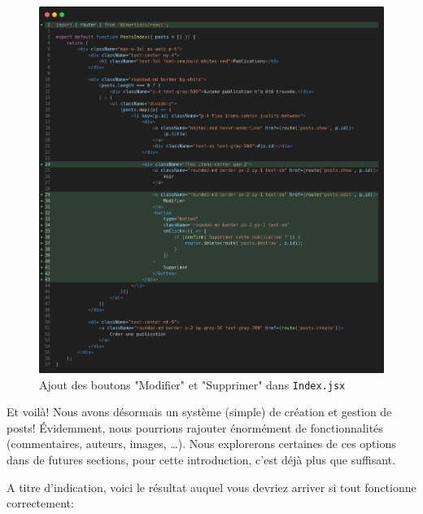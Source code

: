 \begin{figure}
    \centering
    \includegraphics[width=\textwidth]{figures-C1/posts_index_add_edit_delete.png}
    \caption{Ajout des boutons "Modifier" et "Supprimer" dans \texttt{Index.jsx}
    \label{fig:post_delete_blade}}
\end{figure}

Et voilà! Nous avons désormais un système (simple) de création et gestion de posts! Évidemment, nous pourrions rajouter énormément de fonctionnalités (commentaires, auteurs, images, \ldots). Nous explorerons certaines de ces options dans de futures sections, pour cette introduction, c'est déjà plus que suffisant.

A titre d'indication, voici le résultat auquel vous devriez arriver si tout fonctionne correctement:

